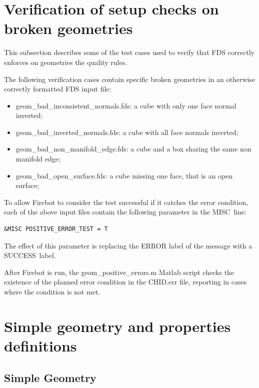 \documentclass[11pt]{book}
\begin{document}
\section{Verification of setup checks on broken geometries}

This subsection describes some of the test cases used to verify that FDS correctly enforces on geometries
the quality rules.

The following verification cases contain specific broken geometries in an otherwise correctly
formatted FDS input file:

\begin{itemize}
  \item {\ct geom\_bad\_inconsistent\_normals.fds}: a cube with only one face normal inverted;
  \item {\ct geom\_bad\_inverted\_normals.fds}: a cube with all face normals inverted;
  \item {\ct geom\_bad\_non\_manifold\_edge.fds}: a cube and a box sharing the same non manifold edge;
  \item {\ct geom\_bad\_open\_surface.fds}: a cube missing one face, that is an open surface;
\end{itemize}

To allow Firebot to consider the test successful if it catches the error condition,
each of the above input files contain the following parameter in the {\ct MISC}\ line:

\begin{lstlisting}
&MISC POSITIVE_ERROR_TEST = T
\end{lstlisting}

The effect of this parameter is replacing the {\ct ERROR} label of the message with a {\ct SUCCESS}\ label.

After Firebot is run, the {\ct geom\_positive\_errors.m} Matlab script checks the existence
of the planned error condition in the {\ct CHID.err} file, reporting in cases where the condition
is not met.


\newpage

\section{Simple geometry and properties definitions}

\subsection{Simple Geometry}
\end{document}
